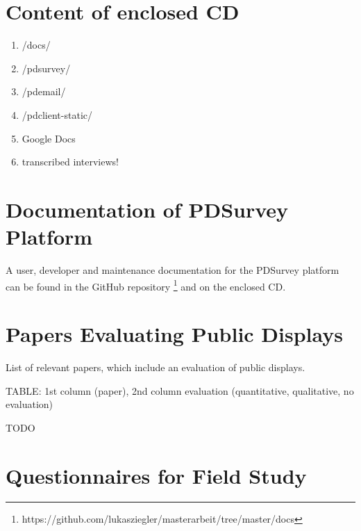 \section{Content of enclosed CD}
\label{appendix:cd-contents}


    \begin{enumerate}
    \item /docs/
    \item /pdsurvey/
    \item /pdemail/
    \item /pdclient-static/
    \item Google Docs
    \item transcribed interviews!
    \end{enumerate}




\section{Documentation of PDSurvey Platform}
\label{appendix:documentation}

  A user, developer and maintenance documentation for the PDSurvey platform can be found in the GitHub repository \footnote{https://github.com/lukasziegler/masterarbeit/tree/master/docs} and on the enclosed CD.




\section{Papers Evaluating Public Displays}
  
  List of relevant papers, which include an evaluation of public displays.

  TABLE: 1st column (paper), 2nd column evaluation (quantitative, qualitative, no evaluation)

  TODO




\section{Questionnaires for Field Study}
\label{appendix:papers}






